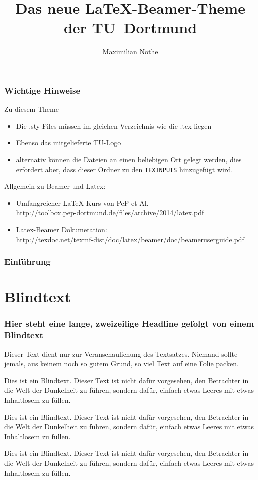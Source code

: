 \documentclass[9pt]{beamer}
\title{Das neue \LaTeX-Beamer-Theme der TU~Dortmund}
\author{Maximilian Nöthe}
\institute{Names des Lehrstuhls \par\medskip Name der Fakultät}
\begin{document}
\begin{frame}
  \setcounter{framenumber}{0}
  \titlepage
\end{frame}

\begin{frame}
  \frametitle{Wichtige Hinweise}
  Zu diesem Theme
  \begin{itemize}
    \item Die .sty-Files müssen im gleichen Verzeichnis wie die .tex liegen
    \item Ebenso das mitgelieferte TU-Logo
    \item alternativ können die Dateien an einen beliebigen Ort gelegt werden,
    dies erfordert aber, dass dieser Ordner zu den \texttt{TEXINPUTS} hinzugefügt wird.
  \end{itemize}
  Allgemein zu Beamer und Latex:
  \begin{itemize}
    \item Umfangreicher \LaTeX-Kurs von PeP et Al. \\
    \url{http://toolbox.pep-dortmund.de/files/archive/2014/latex.pdf}
    \item Latex-Beamer Dokumetation:\\
    \url{http://texdoc.net/texmf-dist/doc/latex/beamer/doc/beameruserguide.pdf}
  \end{itemize}
\end{frame}

\begin{frame}
    \frametitle{Einführung}
    \tableofcontents[pausesections]
\end{frame}

\section{Blindtext}
\begin{frame}
	\frametitle{Hier steht eine lange, zweizeilige Headline
		\newline gefolgt von einem Blindtext}
Dieser Text dient nur zur Veranschaulichung des Textsatzes. Niemand sollte jemals, aus keinem noch so gutem Grund, so viel Text auf eine Folie packen.

Dies ist ein Blindtext. Dieser Text ist nicht dafür vorgesehen, den Betrachter in die Welt der Dunkelheit zu führen, sondern dafür, einfach etwas Leeres mit etwas Inhaltlosem zu füllen.

Dies ist ein Blindtext. Dieser Text ist nicht dafür vorgesehen, den Betrachter in die Welt der Dunkelheit zu führen, sondern dafür, einfach etwas Leeres mit etwas Inhaltlosem zu füllen.

Dies ist ein Blindtext. Dieser Text ist nicht dafür vorgesehen, den Betrachter in die Welt der Dunkelheit zu führen, sondern dafür, einfach etwas Leeres mit etwas Inhaltlosem zu füllen.

\end{frame}
\end{document}
